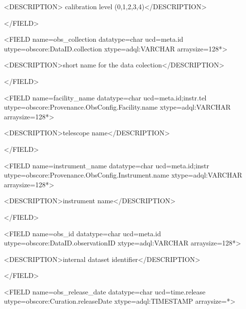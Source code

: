 \documentclass[11pt,a4paper]{ivoa}
\begin{document}
 {\textless}DESCRIPTION{\textgreater} calibration level (0,1,2,3,4){\textless}/DESCRIPTION{\textgreater}

{\textless}/FIELD{\textgreater}

{\textless}FIELD name={\textquotedbl}obs\_collection{\textquotedbl} datatype={\textquotedbl}char{\textquotedbl}
ucd={\textquotedbl}meta.id{\textquotedbl} utype={\textquotedbl}obscore:DataID.collection{\textquotedbl}
xtype={\textquotedbl}adql:VARCHAR{\textquotedbl} arraysize={\textquotedbl}128*{\textquotedbl}{\textgreater}

 {\textless}DESCRIPTION{\textgreater}short name for the data colection{\textless}/DESCRIPTION{\textgreater}

{\textless}/FIELD{\textgreater}

{\textless}FIELD name={\textquotedbl}facility\_name{\textquotedbl} datatype={\textquotedbl}char{\textquotedbl}
ucd={\textquotedbl}meta.id;instr.tel{\textquotedbl}
utype={\textquotedbl}obscore:Provenance.ObsConfig.Facility.name{\textquotedbl}
xtype={\textquotedbl}adql:VARCHAR{\textquotedbl} arraysize={\textquotedbl}128*{\textquotedbl}{\textgreater}

 {\textless}DESCRIPTION{\textgreater}telescope name{\textless}/DESCRIPTION{\textgreater}

{\textless}/FIELD{\textgreater}

{\textless}FIELD name={\textquotedbl}instrument\_name{\textquotedbl} datatype={\textquotedbl}char{\textquotedbl}
ucd={\textquotedbl}meta.id;instr{\textquotedbl}
utype={\textquotedbl}obscore:Provenance.ObsConfig.Instrument.name{\textquotedbl}
xtype={\textquotedbl}adql:VARCHAR{\textquotedbl} arraysize={\textquotedbl}128*{\textquotedbl}{\textgreater}

 {\textless}DESCRIPTION{\textgreater}instrument name{\textless}/DESCRIPTION{\textgreater}

{\textless}/FIELD{\textgreater}

{\textless}FIELD name={\textquotedbl}obs\_id{\textquotedbl} datatype={\textquotedbl}char{\textquotedbl}
ucd={\textquotedbl}meta.id{\textquotedbl} utype={\textquotedbl}obscore:DataID.observationID{\textquotedbl}
xtype={\textquotedbl}adql:VARCHAR{\textquotedbl} arraysize={\textquotedbl}128*{\textquotedbl}{\textgreater}

 {\textless}DESCRIPTION{\textgreater}internal dataset identifier{\textless}/DESCRIPTION{\textgreater}

{\textless}/FIELD{\textgreater}

{\textless}FIELD name={\textquotedbl}obs\_release\_date{\textquotedbl} datatype={\textquotedbl}char{\textquotedbl}
ucd={\textquotedbl}time.release{\textquotedbl} utype={\textquotedbl}obscore:Curation.releaseDate{\textquotedbl}
xtype={\textquotedbl}adql:TIMESTAMP{\textquotedbl} arraysize={\textquotedbl}*{\textquotedbl}{\textgreater}
\end{document}

